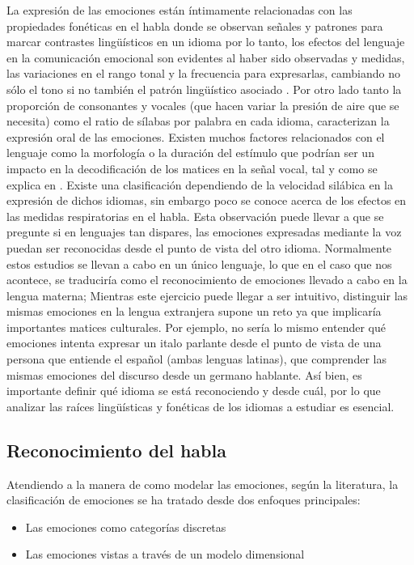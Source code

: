 \documentclass[11pt,a4paper,spanish]{book}
\begin{document}
	La expresión de las emociones están íntimamente relacionadas con las propiedades fonéticas en el habla donde se observan señales y patrones para marcar contrastes lingüísticos en un idioma \cite{Pell2001} por lo tanto, los efectos del lenguaje en la comunicación emocional son evidentes al haber sido observadas y medidas, las variaciones en el rango tonal y la frecuencia para expresarlas, cambiando no sólo el tono si no también el patrón lingüístico asociado \cite{Davletcharova2015}.
	Por otro lado tanto la proporción de consonantes y vocales (que hacen variar la presión de aire que se necesita) como el ratio de sílabas por palabra en cada idioma, caracterizan la expresión oral de las emociones. Existen muchos factores relacionados con el lenguaje como la morfología o la duración del estímulo que podrían ser un impacto en la decodificación de los matices en la señal vocal, tal y como se explica en \cite{Chen2017}.
	Existe una clasificación dependiendo de la velocidad silábica en la expresión de dichos idiomas, sin embargo poco se conoce acerca de los efectos en las medidas respiratorias en el habla. Esta observación puede llevar a que se pregunte si en lenguajes tan dispares, las emociones expresadas mediante la voz puedan ser reconocidas desde el punto de vista del otro idioma.
	Normalmente estos estudios se llevan a cabo en un único lenguaje, lo que en el caso que nos acontece, se traduciría como el reconocimiento de emociones llevado a cabo en la lengua materna; Mientras este ejercicio puede llegar a ser intuitivo, distinguir las mismas emociones en la lengua extranjera supone un reto ya que implicaría importantes matices culturales. Por ejemplo, no sería lo mismo entender qué emociones intenta expresar un italo parlante desde el punto de vista de una persona que entiende el español (ambas lenguas latinas), que comprender las mismas emociones del discurso desde un germano hablante. Así bien, es importante definir qué idioma se está reconociendo y desde cuál, por lo que analizar las raíces lingüísticas y fonéticas de los idiomas a estudiar es esencial. \hfill \break
	
	\subsection{Reconocimiento del habla}
	Atendiendo a la manera de como modelar las emociones, según la literatura, la clasificación de emociones se ha tratado desde dos enfoques principales:
	\begin{itemize}
		\item Las emociones como categorías discretas
		\item Las emociones vistas a través de un modelo dimensional
	\end{itemize}
\end{document}
